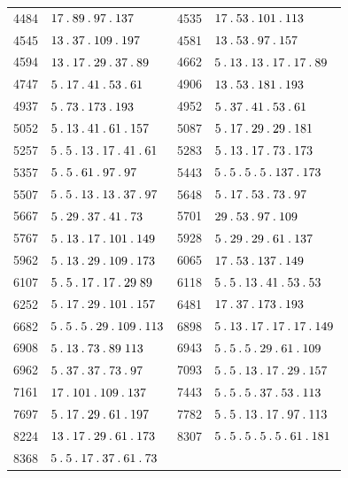\begin{longtable}{@{}r|l@{\qquad}r|l@{}}
4484 & $17\pdot 89\pdot 97\pdot 137$ & 4535 & $17\pdot 53\pdot 101\pdot 113$\\
4545 & $13\pdot 37\pdot 109\pdot 197$ & 4581 & $13\pdot 53\pdot 97\pdot 157$\\
4594 & $13\pdot 17\pdot 29\pdot 37\pdot 89$ & 4662 & $5\pdot 13\pdot 13\pdot 17\pdot 17\pdot 89$\\
4747 & $5\pdot 17\pdot 41\pdot 53\pdot 61$ & 4906 & $13\pdot 53\pdot 181\pdot 193$\\
4937 & $5\pdot 73\pdot 173\pdot 193$ & 4952 & $5\pdot 37\pdot 41\pdot 53\pdot 61$\\
5052 & $5\pdot 13\pdot 41\pdot 61\pdot 157$ & 5087 & $5\pdot 17\pdot 29\pdot 29\pdot 181$\\
5257 & $5\pdot 5\pdot 13\pdot 17\pdot 41\pdot 61$ & 5283 & $5\pdot 13\pdot 17\pdot 73\pdot 173$\\
5357 & $5\pdot 5\pdot 61\pdot 97\pdot 97$ & 5443 & $5\pdot 5\pdot 5\pdot 5\pdot 137\pdot 173$\\
5507 & $5\pdot 5\pdot 13\pdot 13\pdot 37\pdot 97$ & 5648 & $5\pdot 17\pdot 53\pdot 73\pdot 97$\\
5667 & $5\pdot 29\pdot 37\pdot 41\pdot 73$ & 5701 & $29\pdot 53\pdot 97\pdot 109$\\
5767 & $5\pdot 13\pdot 17\pdot 101\pdot 149$ & 5928 & $5\pdot 29\pdot 29\pdot 61\pdot 137$\\
5962 & $5\pdot 13\pdot 29\pdot 109\pdot 173$ & 6065 & $17\pdot 53\pdot 137\pdot 149$\\
6107 & $5\pdot 5\pdot 17\pdot 17\pdot 29\;89$ & 6118 & $5\pdot 5\pdot 13\pdot 41\pdot 53\pdot 53$\\
6252 & $5\pdot 17\pdot 29\pdot 101\pdot 157$ & 6481 & $17\pdot 37\pdot 173\pdot 193$\\
6682 & $5\pdot 5\pdot 5\pdot 29\pdot 109\pdot 113$ & 6898 & $5\pdot 13\pdot 17\pdot 17\pdot 17\pdot 149$\\
6908 & $5\pdot 13\pdot 73\pdot 89\;113$ & 6943 & $5\pdot 5\pdot 5\pdot 29\pdot 61\pdot 109$\\
6962 & $5\pdot 37\pdot 37\pdot 73\pdot 97$ & 7093 & $5\pdot 5\pdot 13\pdot 17\pdot 29\pdot 157$\\
7161 & $17\pdot 101\pdot 109\pdot 137$ & 7443 & $5\pdot 5\pdot 5\pdot 37\pdot 53\pdot 113$\\
7697 & $5\pdot 17\pdot 29\pdot 61\pdot 197$ & 7782 & $5\pdot 5\pdot 13\pdot 17\pdot 97\pdot 113$\\
8224 & $13\pdot 17\pdot 29\pdot 61\pdot 173$ & 8307 & $5\pdot 5\pdot 5\pdot 5\pdot 5\pdot 61\pdot 181$\\
8368 & $5\pdot 5\pdot 17\pdot 37\pdot 61\pdot 73$ &  & \\
\end{longtable}\endgroup
